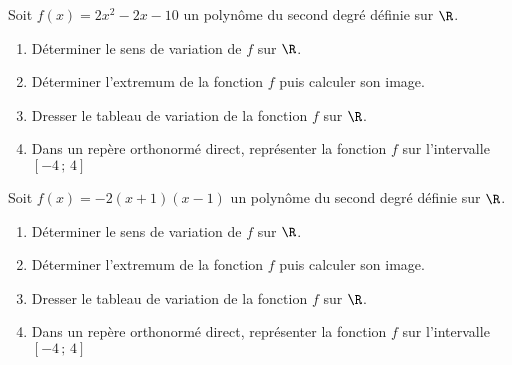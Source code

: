\documentclass[11pt]{article}
\begin{document}
\vspace{-.5cm}

\begin{exercice}
  Soit $f(x)=2x^2-2x-10$ un polynôme du second degré définie sur $\R$.
  \begin{enumerate}
  \item Déterminer le sens de variation de $f$ sur $\R$.
  \item Déterminer l'extremum de la fonction $f$ puis calculer son
    image.
  \item Dresser le tableau de variation de la fonction $f$ sur $\R$.
  \item Dans un repère orthonormé direct, représenter la fonction $f$ sur l'intervalle
    $[-4\,;\,4]$
  \end{enumerate}
\end{exercice}

\nopagebreak

\begin{exercice}
  Soit $f(x)=-2(x+1)(x-1)$ un polynôme du second degré définie sur $\R$.
  \begin{enumerate}
  \item Déterminer le sens de variation de $f$ sur $\R$.
  \item Déterminer l'extremum de la fonction $f$ puis calculer son
    image.
  \item Dresser le tableau de variation de la fonction $f$ sur $\R$.
  \item Dans un repère orthonormé direct, représenter la fonction $f$ sur l'intervalle
    $[-4\,;\,4]$
  \end{enumerate}
\end{exercice}
\end{document}
